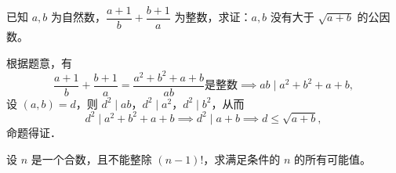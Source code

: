 \documentclass[a4paper,answers]{exam}
\begin{document}
\begin{questions}
\question
已知 $a,b$ 为自然数，$\dfrac{a+1}{b}+\dfrac{b+1}a$ 为整数，求证：$a,b$ 没有大于 $\sqrt{a+b}$ 的公因数。

\begin{solution}[\stretch{1}]
    根据题意，有\[\dfrac{a+1}{b}+\dfrac{b+1}a = \dfrac{a^2+b^2+a+b}{ab} \text{是整数} \implies ab\mid a^2+b^2+a+b,\]设 $(a,b)=d$，则 $d^2\mid ab$，$d^2\mid a^2$，$d^2\mid b^2$，从而\[d^2\mid a^2+b^2+a+b\implies d^2\mid a+b\implies d\leqslant \sqrt{a+b},\]命题得证．
\end{solution}

%

%
%
%

\question
设 $n$ 是一个合数，且不能整除 $(n-1)!$，求满足条件的 $n$ 的所有可能值。


\end{questions}
\end{document}

